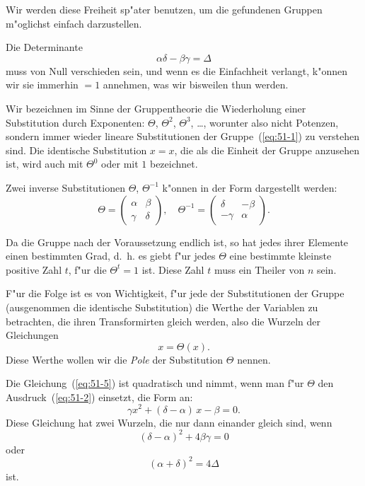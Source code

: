 \documentclass[12pt,a4paper]{article}
\theoremstyle{definition}
\begin{document}
Wir werden diese Freiheit sp"ater benutzen, um die gefundenen Gruppen m"oglichst einfach darzustellen.

Die Determinante
\[
\alpha\delta - \beta\gamma = \Delta
\]
muss von Null verschieden sein, und wenn es die Einfachheit verlangt, k"onnen wir sie immerhin $= 1$ annehmen, was wir bisweilen thun werden.

Wir bezeichnen im Sinne der Gruppentheorie die Wiederholung einer Substitution durch Exponenten: $\Theta$, $\Theta^2$, $\Theta^3$, \ldots, worunter also nicht Potenzen, sondern immer wieder lineare Substitutionen der Gruppe~(\ref{eq:51-1}) zu verstehen sind. Die identische Substitution $x = x$, die als die Einheit der Gruppe anzusehen ist, wird auch mit $\Theta^0$ oder mit $1$ bezeichnet.

Zwei inverse Substitutionen $\Theta$, $\Theta^{-1}$ k"onnen in der Form dargestellt werden:
\[
\Theta = \begin{pmatrix} \alpha & \beta \\ \gamma & \delta \end{pmatrix}, \quad
\Theta^{-1} = \begin{pmatrix} \delta & -\beta \\ -\gamma & \alpha \end{pmatrix}.
\]

Da die Gruppe nach der Voraussetzung endlich ist, so hat jedes ihrer Elemente einen bestimmten Grad, d.~h. es giebt f"ur jedes $\Theta$ eine bestimmte kleinste positive Zahl $t$, f"ur die $\Theta^t = 1$ ist. Diese Zahl $t$ muss ein Theiler von $n$ sein.

F"ur die Folge ist es von Wichtigkeit, f"ur jede der Substitutionen der Gruppe (ausgenommen die identische Substitution) die Werthe der Variablen zu betrachten, die ihren Transformirten gleich werden, also die Wurzeln der Gleichungen
\begin{equation}\label{eq:51-5}
x = \Theta(x).
\end{equation}
Diese Werthe wollen wir die \emph{Pole} der Substitution $\Theta$ nennen.

Die Gleichung~(\ref{eq:51-5}) ist quadratisch und nimmt, wenn man f"ur $\Theta$ den Ausdruck~(\ref{eq:51-2}) einsetzt, die Form an:
\begin{equation}\label{eq:51-6}
\gamma x^2 + (\delta - \alpha)\,x - \beta = 0.
\end{equation}
Diese Gleichung hat zwei Wurzeln, die nur dann einander gleich sind, wenn
\begin{equation}\label{eq:51-7}
(\delta - \alpha)^2 + 4\beta\gamma = 0
\end{equation}
oder
\begin{equation}\label{eq:51-8}
(\alpha + \delta)^2 = 4\Delta
\end{equation}
ist.
\end{document}
